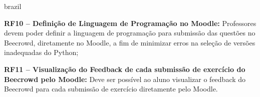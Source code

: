 \begin{otherlanguage*}{brazil}
\vspace{12pt}

\textbf{RF10 – Definição de Linguagem de Programação no Moodle:} Professores devem poder definir a linguagem de programação para submissão das questões no Beecrowd, diretamente no Moodle, a fim de minimizar erros na seleção de versões inadequadas do Python;

\vspace{12pt}

\textbf{RF11 – Visualização do Feedback de cada submissão de exercício do Beecrowd pelo Moodle:} Deve ser possível ao aluno visualizar o feedback do Beecrowd para cada submissão de exercício diretamente pelo Moodle.

\end{otherlanguage*}

